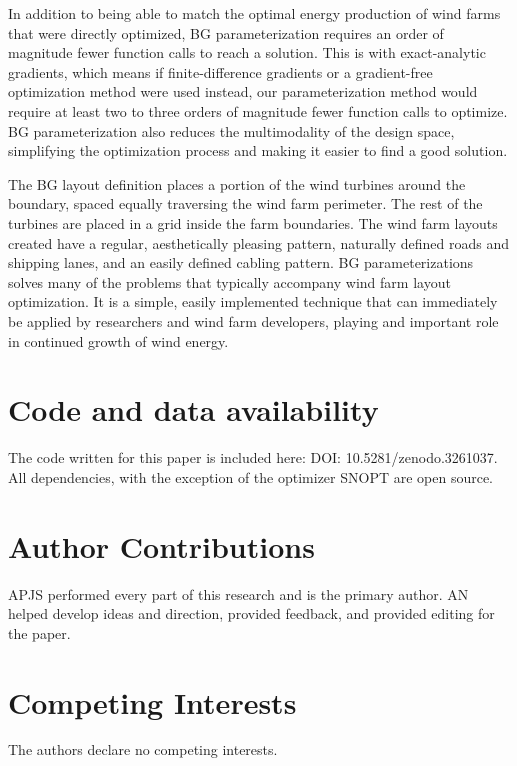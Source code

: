 \documentclass[wes, manuscript]{copernicus}
\begin{document}
In addition to being able to match the optimal energy production of wind farms that were directly optimized, BG parameterization requires an order of magnitude fewer function calls to reach a solution. This is with exact-analytic gradients, which means if finite-difference gradients or a gradient-free optimization method were used instead, our parameterization method would require at least two to three orders of magnitude fewer function calls to optimize.
%
BG parameterization also reduces the multimodality of the design space, simplifying the optimization process and making it easier to find a good solution.

The BG layout definition places a portion of the wind turbines around the boundary, spaced equally traversing the wind farm perimeter. The rest of the turbines are placed in a grid inside the farm boundaries. The wind farm layouts created have a regular, aesthetically pleasing pattern, naturally defined roads and shipping lanes, and an easily defined cabling pattern. 
%
BG parameterizations solves many of the problems that typically accompany wind farm layout optimization. It is a simple, easily implemented technique that can immediately be applied by researchers and wind farm developers, playing and important role in continued growth of wind energy.

\section*{Code and data availability}
The code written for this paper is included here: DOI: 10.5281/zenodo.3261037. All dependencies, with the exception of the optimizer SNOPT are open source.

\section*{Author Contributions}
APJS performed every part of this research and is the
primary author. AN helped develop ideas and direction, provided
feedback, and provided editing for the paper.

\section*{Competing Interests}
The authors declare no competing interests.





\end{document}

